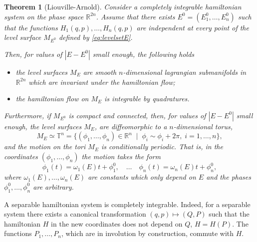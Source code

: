 \documentclass[english,fontsize=11pt,paper=a5,oneside]{scrbook}
\newcommand{\R}{\mathbb{R}}
\newcommand{\T}{\mathbb{T}}
\newtheorem{theorem}{Theorem}[chapter]
\theoremstyle{definition}
\newenvironment{remark}
  {\pushQED{\qed}\renewcommand{\qedsymbol}{$\lozenge$}\remarkx}
  {\popQED\endremarkx}
\begin{document}
\begin{theorem}[Liouville-Arnold]\label{thm:liouvillearnold}
    Consider a completely integrable hamiltonian system on the phase space $\R^{2n}$.
    Assume that there exists $E^0 = (E^0_1, \ldots, E^0_n)$ such that the functions $H_1(q,p), \ldots, H_n(q,p)$ are independent at every point of the level surface $M_{E^0}$ defined by \eqref{eq:levelsetE}.

    Then, for values of $|E-E^0|$ small enough, the following holds
    \begin{itemize}
        \item the level surfaces $M_E$ are smooth $n$-dimensional lagrangian submanifolds in $\R^{2n}$ which are invariant under the hamiltonian flow;
        \item the hamiltonian flow on $M_E$ is integrable by quadratures.
    \end{itemize}

    Furthermore, if $M_{E^0}$ is compact and connected, then, for values of $|E-E^0|$ small enough, the level surfaces $M_E$,  are diffeomorphic to a $n$-dimensional torus,
    \begin{equation}\label{eq:idtorusstd}
        M_E \simeq \T^n = \big\{ (\phi_1, \ldots, \phi_n)\in\R^n \;\mid\; \phi_i \sim \phi_i+2\pi, \; i=1,\ldots,n \big\},
    \end{equation}
    and the motion on the tori $M_E$ is \emph{conditionally periodic}. That is, in the coordinates $(\phi_1, \ldots, \phi_n)$ the motion takes the form
    \begin{equation}\label{eq:condperflow}
        \phi_1(t) = \omega_1(E) t + \phi_1^0,
        \quad\ldots\quad
        \phi_n(t) = \omega_n(E) t + \phi_n^0,
    \end{equation}
    where $\omega_1(E),\ldots,\omega_n(E)$ are constants which only depend on $E$ and the phases $\phi_1^0,\ldots,\phi_n^0$ are arbitrary.
\end{theorem}

\begin{remark}
    A separable hamiltonian system is completely integrable.
    Indeed, for a separable system there exists a canonical transformation $(q,p) \mapsto (Q,P)$ such that the hamiltonian $H$ in the new coordinates does not depend on $Q$, $H=H(P)$.
    The functions $P_1, \ldots, P_n$, which are in involution by construction, commute with $H$.
\end{remark}
\end{document}
